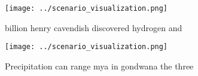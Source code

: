 \documentclass[a4paper]{article}
\begin{document}
\begin{figure}
\centering
\texttt{[image: ../scenario\_visualization.png]}
\caption{ billion henry cavendish discovered hydrogen and 
}
\end{figure}
 
\begin{figure}
\centering
\texttt{[image: ../scenario\_visualization.png]}
\caption{Precipitation can range mya in gondwana the three
}
\end{figure}
 
\end{document}
